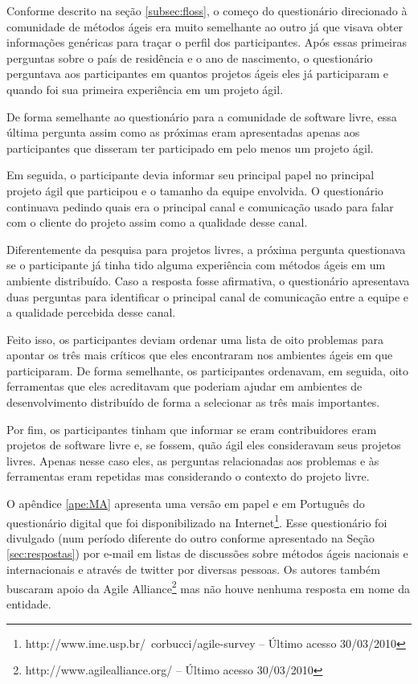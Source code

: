 Conforme descrito na seção \ref{subsec:floss}, o começo do
questionário direcionado à comunidade de métodos ágeis era muito
semelhante ao outro já que visava obter informações genéricas para
traçar o perfil dos participantes.  Após essas primeiras perguntas
sobre o país de residência e o ano de nascimento, o questionário
perguntava aos participantes em quantos projetos ágeis eles já
participaram e quando foi sua primeira experiência em um projeto ágil.

De forma semelhante ao questionário para a comunidade de software
livre, essa última pergunta assim como as próximas eram apresentadas
apenas aos participantes que disseram ter participado em pelo menos um
projeto ágil.

Em seguida, o participante devia informar seu principal papel no
principal projeto ágil que participou e o tamanho da equipe
envolvida. O questionário continuava pedindo quais era o principal
canal e comunicação usado para falar com o cliente do projeto assim
como a qualidade desse canal.

Diferentemente da pesquisa para projetos livres, a próxima pergunta
questionava se o participante já tinha tido alguma experiência com
métodos ágeis em um ambiente distribuído. Caso a resposta fosse
afirmativa, o questionário apresentava duas perguntas para identificar
o principal canal de comunicação entre a equipe e a qualidade
percebida desse canal.

Feito isso, os participantes deviam ordenar uma lista de oito
problemas para apontar os três mais críticos que eles encontraram nos
ambientes ágeis em que participaram. De forma semelhante, os
participantes ordenavam, em seguida, oito ferramentas que eles
acreditavam que poderiam ajudar em ambientes de desenvolvimento
distribuído de forma a selecionar as três mais importantes.

Por fim, os participantes tinham que informar se eram contribuidores
eram projetos de software livre e, se fossem, quão ágil eles
consideravam seus projetos livres. Apenas nesse caso eles, as
perguntas relacionadas aos problemas e às ferramentas eram repetidas
mas considerando o contexto do projeto livre.

O apêndice \ref{ape:MA} apresenta uma versão em papel e em Português
do questionário digital que foi disponibilizado na
Internet\footnote{http://www.ime.usp.br/~corbucci/agile-survey --
  Último acesso 30/03/2010}. Esse questionário foi divulgado (num
período diferente do outro conforme apresentado na Seção
\ref{sec:respostas}) por e-mail em listas de discussões sobre métodos
ágeis nacionais e internacionais e através de twitter por diversas
pessoas. Os autores também buscaram apoio da Agile
Alliance\footnote{http://www.agilealliance.org/ -- Último acesso
  30/03/2010} mas não houve nenhuma resposta em nome da entidade.

